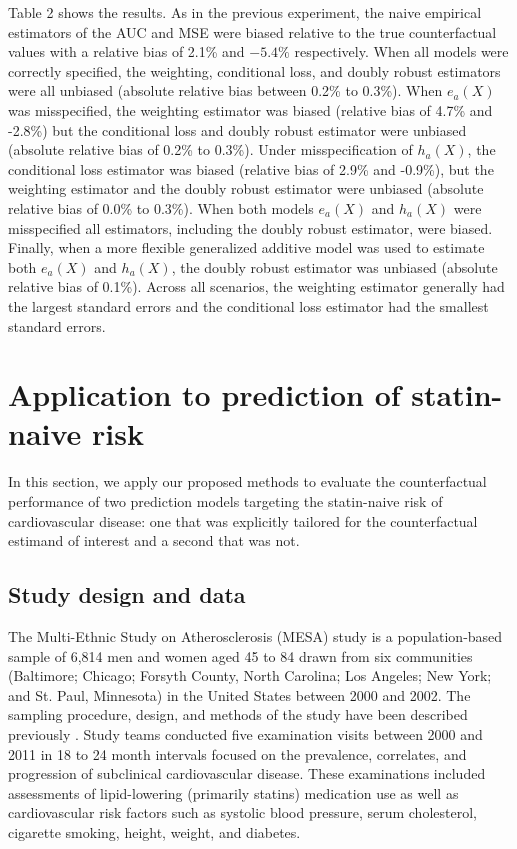 Table 2 shows the results. As in the previous experiment, the naive empirical estimators of the AUC and MSE were biased relative to the true counterfactual values with a relative bias of 2.1\% and $-5.4\%$ respectively. When all models were correctly specified, the weighting, conditional loss, and doubly robust estimators were all unbiased (absolute relative bias between 0.2\% to 0.3\%). When $e_a(X)$ was misspecified, the weighting estimator was biased (relative bias of 4.7\% and -2.8\%) but the conditional loss and doubly robust estimator were unbiased (absolute relative bias of 0.2\% to 0.3\%). Under misspecification of $h_a(X)$, the conditional loss estimator was biased (relative bias of 2.9\% and -0.9\%), but the weighting estimator and the doubly robust estimator were unbiased (absolute relative bias of 0.0\% to 0.3\%). When both models $e_a(X)$ and $h_a(X)$ were misspecified all estimators, including the doubly robust estimator, were biased. Finally, when a more flexible generalized additive model was used to estimate both $e_a(X)$ and $h_a(X)$, the doubly robust estimator was unbiased (absolute relative bias of 0.1\%). Across all scenarios, the weighting estimator generally had the largest standard errors and the conditional loss estimator had the smallest standard errors.

\section{Application to prediction of statin-naive risk} \label{sec:results}
In this section, we apply our proposed methods to evaluate the counterfactual performance of two prediction models targeting the statin-naive risk of cardiovascular disease: one that was explicitly tailored for the counterfactual estimand of interest and a second that was not. 

\subsection{Study design and data}
The Multi-Ethnic Study on Atherosclerosis (MESA) study is a population-based sample of 6,814 men and women aged 45 to 84 drawn from six communities (Baltimore; Chicago; Forsyth County, North Carolina; Los Angeles; New York; and St. Paul, Minnesota) in the United States between 2000 and 2002. The sampling procedure, design, and methods of the study have been described previously \cite{bild_multi-ethnic_2002}. Study teams conducted five examination visits between 2000 and 2011 in 18 to 24 month intervals focused on the prevalence, correlates, and progression of subclinical cardiovascular disease. These examinations included assessments of lipid-lowering (primarily statins) medication use as well as cardiovascular risk factors such as systolic blood pressure, serum cholesterol, cigarette smoking, height, weight, and diabetes. 

